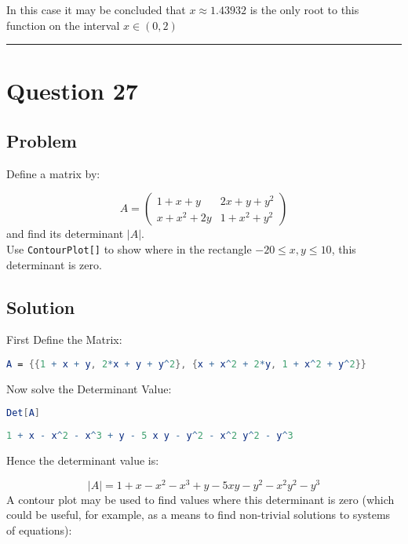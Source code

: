 \documentclass[12pt]{article}
\begin{document}
In this case it may be concluded that $x \approx 1.43932 $ is the only root to this function on the interval $x \in \left( 0,2 \right)$ 

\begin{flushright}
{\rule{0.7em}{0.7em}}
\end{flushright}

\newpage 

\section{Question 27}
\subsection{Problem}
Define a matrix by:

$$
A = \begin{pmatrix}
  1+ x+ y & 2x +  y +  y^2 \\
  x +  x^2 +  2y & 1 +  x^2 +  y ^2
\end{pmatrix}
$$
and find its determinant $\left| A \right|$.\\
Use \verb|ContourPlot[]| to show where in the rectangle $-20 \leq x, y \leq 10$, this determinant is zero.

\subsection{Solution}

First Define the Matrix:

\begin{lstlisting}[language = Mathematica]
A = {{1 + x + y, 2*x + y + y^2}, {x + x^2 + 2*y, 1 + x^2 + y^2}}
\end{lstlisting}	

Now solve the Determinant Value:

\begin{lstlisting}[language = Mathematica]
Det[A]
\end{lstlisting}	

\begin{lstlisting}[language = Mathematica]
1 + x - x^2 - x^3 + y - 5 x y - y^2 - x^2 y^2 - y^3
\end{lstlisting}	

Hence the determinant value is:

$$
\left| A \right|= 1 +  x -  x^2 - x^3 +  y -  5xy -  y^2 -  x^2y^2- y^3
$$
A contour plot may be used to find values where this determinant is zero (which could be useful, for example, as a means to find non-trivial solutions to systems of equations):
\end{document}
